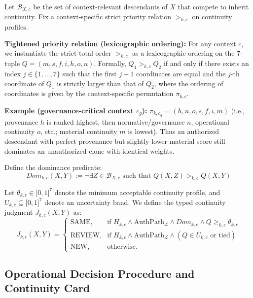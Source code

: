 \documentclass[11pt,a4paper]{article}
\begin{document}
Let \(\mathcal{B}_{X,c}\) be the set of context-relevant descendants of \(X\) that compete to inherit continuity. Fix a context-specific strict priority relation \(>_{k,c}\) on continuity profiles. 

\textbf{Tightened priority relation (lexicographic ordering):}  
For any context \(c\), we instantiate the strict total order \(>_{k,c}\) as a lexicographic ordering on the 7-tuple \(Q = (m, s, f, i, h, o, n)\).  
Formally, \(Q_1 >_{k,c} Q_2\) if and only if there exists an index \(j \in \{1,\dots,7\}\) such that the first \(j-1\) coordinates are equal and the \(j\)-th coordinate of \(Q_1\) is strictly larger than that of \(Q_2\), where the ordering of coordinates is given by the context-specific permutation \(\pi_{k,c}\).  

\textbf{Example (governance-critical context \(c_g\)):}  
\(\pi_{k,c_g} = (h, n, o, s, f, i, m)\)  
(i.e., provenance \(h\) is ranked highest, then normative/governance \(n\), operational continuity \(o\), etc.; material continuity \(m\) is lowest).  
Thus an authorized descendant with perfect provenance but slightly lower material score still dominates an unauthorized clone with identical weights.

Define the dominance predicate:
\begin{equation}
Dom_{k,c}(X, Y) := \neg \exists Z \in \mathcal{B}_{X,c} \text{ such that } Q(X, Z) >_{k,c} Q(X, Y)
\end{equation}

Let \(\theta_{k,c} \in \lbrack 0, 1 \rbrack^7\) denote the minimum acceptable continuity profile, and \(U_{k,c} \subseteq \lbrack 0, 1 \rbrack^7\) denote an uncertainty band. We define the typed continuity judgment \(J_{k,c}(X, Y)\) as:
\begin{equation}
J_{k,c}(X,Y) = 
\begin{cases} 
\text{SAME}, & \text{if } H_{k,c} \wedge \mathrm{AuthPath}_{\mathcal{L}} \wedge Dom_{k,c} \wedge Q \ge_{k,c} \theta_{k,c} \\
\text{REVIEW}, & \text{if } H_{k,c} \wedge \mathrm{AuthPath}_{\mathcal{L}} \wedge (Q \in U_{k,c} \text{ or tied}) \\
\text{NEW}, & \text{otherwise.}
\end{cases}
\end{equation}

\subsection{Operational Decision Procedure and Continuity Card}
\end{document}
